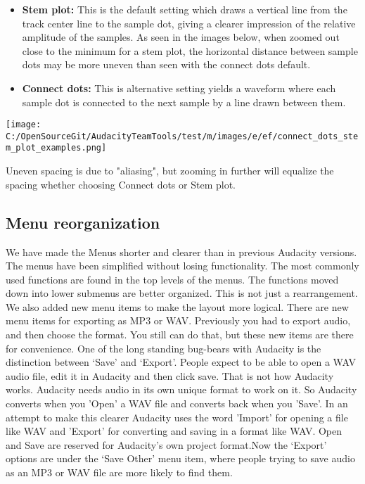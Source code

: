 \begin{multicols}{2}
\begin{itemize}
\item \textbf{Stem plot:} This is the default setting which draws a vertical line from the track center line to the sample dot, giving a clearer impression of the relative amplitude of the samples. As seen in the images below, when zoomed out close to the minimum for a stem plot, the horizontal distance between sample dots may be more uneven than seen with the connect dots default.   
\item \textbf{Connect dots:} This is alternative setting yields a waveform where each sample dot is connected to the next sample by a line drawn between them.  
\end{itemize}

\par\texttt{[image: C:/OpenSourceGit/AudacityTeamTools/test/m/images/e/ef/connect\_dots\_stem\_plot\_examples.png]}\par
Uneven spacing is due to "aliasing", but zooming in further will equalize the spacing whether choosing Connect dots or Stem plot.
\subsection{Menu reorganization}
\label{new:features:in:this:release:menus}We have made the Menus shorter and clearer than in previous Audacity versions. The menus have been simplified without losing functionality. The most commonly used functions are found in the top levels of the menus. The functions moved down into lower submenus are better organized.
This is not just a rearrangement.  We also added new menu items to make the layout more logical.  There are new menu items for exporting as MP3 or WAV. Previously you had to export audio, and then choose the format. You still can do that, but these new items are there for convenience.
One of the long standing bug-bears with Audacity is the distinction between ‘Save’ and ‘Export’. People expect to be able to open a WAV audio file, edit it in Audacity and then click save. That is not how Audacity works. Audacity needs audio in its own unique format to work on it. So Audacity converts when you 'Open' a WAV file and converts back when you 'Save'. In an attempt to make this clearer Audacity uses the word 'Import' for opening a file like WAV and 'Export' for converting and saving in a format like WAV. Open and Save are reserved for Audacity's own project format.Now the ‘Export’ options are under the ‘Save Other’ menu item, where people trying to save audio as an MP3 or WAV file are more likely to find them.

\end{multicols}
